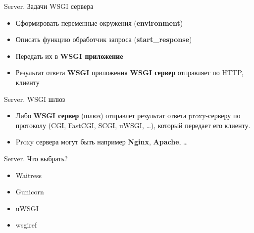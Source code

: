 \begin{frame}{Server. Задачи WSGI сервера}

    \begin{itemize}
        \item Сформировать переменные окружения (\textbf{environment})
        \item Описать функцию обработчик запроса (\textbf{start\_response})
        \item Передать их в \textbf{WSGI приложение}
        \item Результат ответа \textbf{WSGI} приложения \textbf{WSGI сервер}
          отправляет по HTTP, клиенту
    \end{itemize}

\end{frame}

\begin{frame}{Server. WSGI шлюз}

    \begin{itemize}

      \item Либо \textbf{WSGI сервер} (шлюз) отправлет результат ответа proxy-серверу
        по протоколу (CGI, FastCGI, SCGI, uWSGI, \ldots), который передает его
        клиенту.
      \item Proxy сервера могут быть например \textbf{Nginx}, \textbf{Apache},
        \ldots

    \end{itemize}

\end{frame}


\begin{frame}{Server. Что выбрать?}

    \begin{itemize}

      \item Waitress
      \item Gunicorn
      \item uWSGI
      \item wsgiref

    \end{itemize}

\end{frame}


